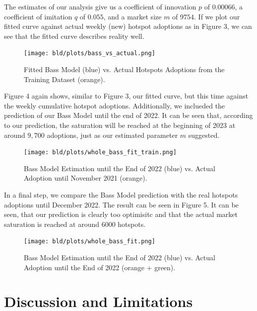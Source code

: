 \documentclass{article}
\begin{document}
\bigskip

\noindent The estimates of our analysis give us a coefficient of innovation $p$ of $0.00066$, a coefficient of imitation $q$ of $0.055$, and a market size $m$ of $9754$. If we
plot our fitted curve against actual weekly (new) hotspot adoptions as in Figure 3, we can see that the fitted curve describes reality well.

\begin{figure}[!hptb]
    \centering{}\texttt{[image: bld/plots/bass\_vs\_actual.png]}\\
    \caption{Fitted Bass Model (blue) vs. Actual Hotspots Adoptions from the Training Dataset (orange).}
\end{figure}

\noindent Figure 4 again shows, similar to Figure 3, our fitted curve, but this time against the weekly cumulative hotspot adoptions. Additionally, we inclueded the prediction
of our Bass Model until the end of 2022. It can be seen that, according to our prediction, the saturation will be reached at the beginning of 2023 at around $9,700$ adoptions,
just as our estimated parameter $m$ suggested.

\bigskip
\bigskip
\bigskip
\bigskip

\begin{figure}[!hptb]
    \centering{}\texttt{[image: bld/plots/whole\_bass\_fit\_train.png]}\\
    \caption{Bass Model Estimation until the End of 2022 (blue) vs. Actual Adoption until November 2021 (orange).}
\end{figure}

\noindent In a final step, we compare the Bass Model prediction with the real hotspots adoptions until December 2022. The result can be seen in Figure 5. It can be seen, that our
prediction is clearly too optimisitc and that the actual market saturation is reached at around $6000$ hotspots.

\begin{figure}[!hptb]
    \centering{}\texttt{[image: bld/plots/whole\_bass\_fit.png]}\\
    \caption{Bass Model Estimation until the End of 2022 (blue) vs. Actual Adoption until the End of 2022 (orange + green).}
\end{figure}


\section{Discussion and Limitations}
\end{document}
